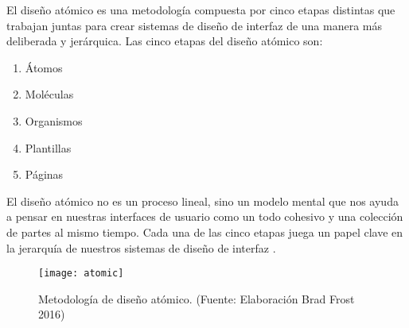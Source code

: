 El diseño atómico es una metodología compuesta por cinco etapas distintas que trabajan juntas para crear sistemas de diseño de interfaz de una manera más deliberada y jerárquica. Las cinco etapas del diseño atómico son:
\vspace{0.8cm}

\begin{enumerate}
  \item Átomos
  \item Moléculas
  \item Organismos
  \item Plantillas
  \item Páginas
\end{enumerate}
\vspace{0.8cm}

El diseño atómico no es un proceso lineal, sino un modelo mental que nos ayuda a pensar en nuestras interfaces de usuario como un todo cohesivo y una colección de partes al mismo tiempo. Cada una de las cinco etapas juega un papel clave en la jerarquía de nuestros sistemas de diseño de interfaz \cite{frost}.
\vspace{0.8cm}


\begin{figure}[H]
  \centering
  \texttt{[image: atomic]}
  \caption{Metodología de diseño atómico. (Fuente: Elaboración Brad Frost 2016)}
\end{figure}